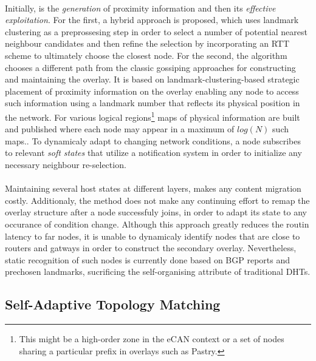 \documentclass[a4paper,10pt]{article}
\begin{document}
\paragraph{}
Initially, is the \emph{generation} of proximity information and then its \emph{effective exploitation}. For the first, a hybrid approach is proposed, which uses landmark clustering as a preprossesing step in order to select a number of potential nearest neighbour candidates and then refine the selection by incorporating an RTT scheme to ultimately choose the closest node. For the second, the algorithm chooses a different path from the classic gossiping approaches for constructing and maintaining the overlay. It is based on landmark-clustering-based strategic placement of proximity information on the overlay enabling any node to access such information using a landmark number that reflects its physical position in the network. For various logical regions\footnote{This might be a high-order zone in the eCAN\cite{xu_ecan_2002} context or a set of nodes sharing a particular prefix in overlays such as Pastry.} maps of physical information are built and published where each node may appear in a maximum of $log\left( N \right)$ such maps.. To dynamicaly adapt to changing network conditions, a node subscribes to relevant \emph{soft states} that utilize a notification system in order to initialize any necessary neighbour re-selection.

\paragraph{}
Maintaining several host states at different layers, makes any content migration costly. Additionaly, the method does not make any continuing effort to remap the overlay structure after a node successfuly joins, in order to adapt its state to any occurance of condition change. Although this approach greatly reduces the routin latency to far nodes, it is unable to dynamicaly identify nodes that are close to routers and gatways in order to construct the secondary overlay. Nevertheless, static recognition of such nodes is currently done based on BGP reports and prechosen landmarks, sucrificing the self-organising attribute of traditional DHTs.

\subsection{Self-Adaptive Topology Matching}
\end{document}
